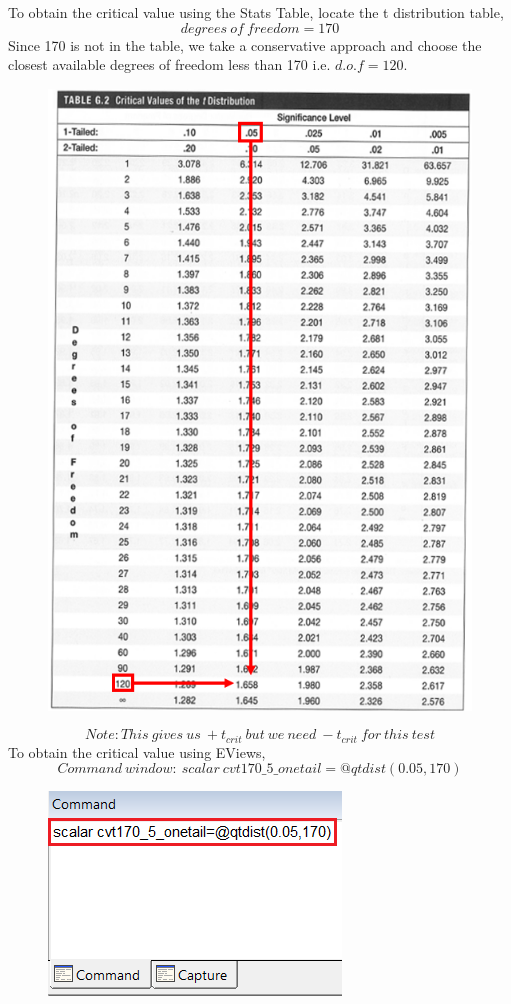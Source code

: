 \documentclass[12pt]{report}
\begin{document}
\noindent To obtain the critical value using the Stats Table, locate the t distribution table,
$$degrees\ of\ freedom = 170$$
\noindent Since 170 is not in the table, we take a conservative approach and choose the closest available degrees of freedom less than 170 i.e. $d.o.f=120$. 
\begin{figure}[H]
	\centering
	\includegraphics{q1_24}
\end{figure}
\vspace{-\baselineskip}
$$Note:This\ gives\ us\ +t_{crit}\ but\ we\ need\ -t_{crit}\ for\ this\ test$$
\noindent To obtain the critical value using EViews,
$$Command\ window:\ scalar\ cvt170\_5\_onetail=@qtdist(0.05,170)$$
\begin{figure}[H]
	\centering
	\includegraphics{q1_25}
\end{figure}
\end{document}
